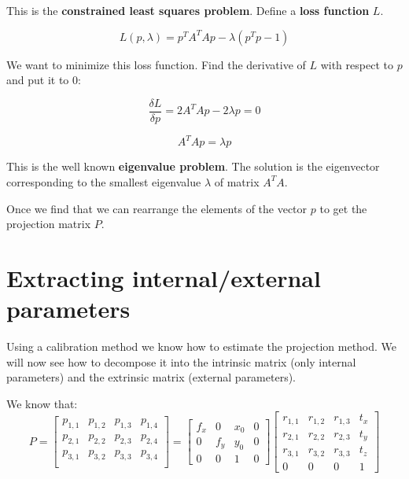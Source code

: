 \documentclass{article}
\begin{document}
This is the \textbf{constrained least squares problem}. 
Define a \textbf{loss function} $L$.

\begin{equation*}
    L(p, \lambda) = p^TA^TAp - \lambda(p^Tp - 1)
\end{equation*}

We want to minimize this loss function. Find the derivative of $L$ with respect to $p$ and put it to $0$:

\begin{equation*}
    \frac{\delta L}{\delta p} = 2A^T Ap - 2\lambda p = 0
\end{equation*}

\begin{equation*}
    A^TAp = \lambda p
\end{equation*}

This is the well known \textbf{eigenvalue problem}. The solution is the eigenvector corresponding to the smallest eigenvalue $\lambda$ of matrix $A^TA$.

Once we find that we can rearrange the elements of the vector $p$ to get the projection matrix $P$.

\newpage

\section*{Extracting internal/external parameters}

Using a calibration method we know how to estimate the projection method. We will now see how to decompose it into the intrinsic matrix (only internal parameters) and the extrinsic matrix (external parameters). 

We know that:
\begin{equation*}
    P = 
    \begin{bmatrix}
        p_{1, 1} & p_{1, 2} & p_{1, 3} & 
        p_{1, 4} \\
        p_{2, 1} & p_{2, 2} & p_{2, 3} & 
        p_{2, 4} \\
        p_{3, 1} & p_{3, 2} & p_{3, 3} & 
        p_{3, 4} \\
    \end{bmatrix}
    =
    \begin{bmatrix}
        f_x & 0 & x_0 & 0 \\
        0 & f_y & y_0 & 0 \\
        0 & 0 & 1 & 0
    \end{bmatrix}
    \begin{bmatrix}
        r_{1, 1} & r_{1, 2} & r_{1, 3} & 
        t_x \\
        r_{2, 1} & r_{2, 2} & r_{2, 3} & 
        t_y \\
        r_{3, 1} & r_{3, 2} & r_{3, 3} & 
        t_z \\
        0 & 0 & 0 & 1
    \end{bmatrix}
\end{equation*}
\end{document}

